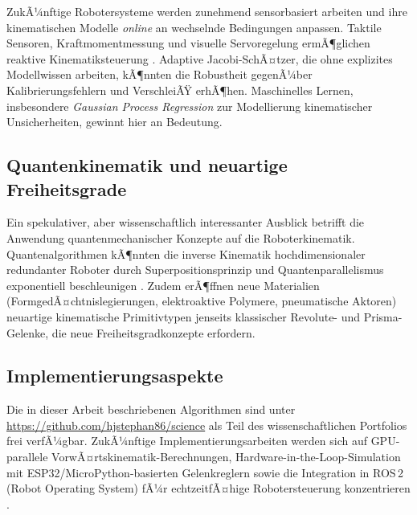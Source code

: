 ﻿\documentclass[a4paper,12pt]{article}
\theoremstyle{definition}
\begin{document}
ZukÃ¼nftige Robotersysteme werden zunehmend sensorbasiert arbeiten und ihre kinematischen Modelle \emph{online} an wechselnde Bedingungen anpassen. Taktile Sensoren, Kraftmomentmessung und visuelle Servoregelung ermÃ¶glichen reaktive Kinematiksteuerung \cite{chaumette2006visual}. Adaptive Jacobi-SchÃ¤tzer, die ohne explizites Modellwissen arbeiten, kÃ¶nnten die Robustheit gegenÃ¼ber Kalibrierungsfehlern und VerschleiÃŸ erhÃ¶hen. Maschinelles Lernen, insbesondere \emph{Gaussian Process Regression} zur Modellierung kinematischer Unsicherheiten, gewinnt hier an Bedeutung.

\subsection{Quantenkinematik und neuartige Freiheitsgrade}

Ein spekulativer, aber wissenschaftlich interessanter Ausblick betrifft die Anwendung quantenmechanischer Konzepte auf die Roboterkinematik. Quantenalgorithmen kÃ¶nnten die inverse Kinematik hochdimensionaler redundanter Roboter durch Superpositionsprinzip und Quantenparallelismus exponentiell beschleunigen \cite{biamonte2017quantum}. Zudem erÃ¶ffnen neue Materialien (FormgedÃ¤chtnislegierungen, elektroaktive Polymere, pneumatische Aktoren) neuartige kinematische Primitivtypen jenseits klassischer Revolute- und Prisma-Gelenke, die neue Freiheitsgradkonzepte erfordern.

\subsection{Implementierungsaspekte}

Die in dieser Arbeit beschriebenen Algorithmen sind unter \url{https://github.com/hjstephan86/science} als Teil des wissenschaftlichen Portfolios frei verfÃ¼gbar. ZukÃ¼nftige Implementierungsarbeiten werden sich auf GPU-parallele VorwÃ¤rtskinematik-Berechnungen, Hardware-in-the-Loop-Simulation mit ESP32/MicroPython-basierten Gelenkreglern sowie die Integration in ROS\,2 (Robot Operating System) fÃ¼r echtzeitfÃ¤hige Robotersteuerung konzentrieren \cite{quigley2009ros}.
\end{document}
